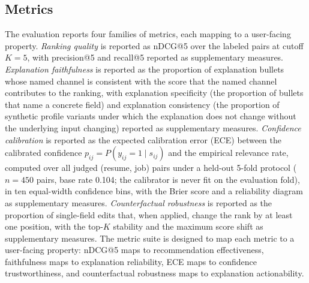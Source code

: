 \subsection{Metrics}\label{sec:4.3}
The evaluation reports four families of metrics, each mapping to a user-facing property.
\emph{Ranking quality} is reported as nDCG@5 \citep{jarvelin2002ndcg} over the labeled pairs at cutoff $K = 5$, with precision@5 and recall@5 reported as supplementary measures.
\emph{Explanation faithfulness} is reported as the proportion of explanation bullets whose named channel is consistent with the score that the named channel contributes to the ranking, with explanation specificity (the proportion of bullets that name a concrete field) and explanation consistency (the proportion of synthetic profile variants under which the explanation does not change without the underlying input changing) reported as supplementary measures.
\emph{Confidence calibration} is reported as the expected calibration error (ECE) \citep{guo2017calibration} between the calibrated confidence $p_{ij} = P(y_{ij}{=}1 \mid s_{ij})$ and the empirical relevance rate, computed over all judged (resume, job) pairs under a held-out 5-fold protocol ($n = 450$ pairs, base rate 0.104; the calibrator is never fit on the evaluation fold), in ten equal-width confidence bins, with the Brier score \citep{brier1950verification} and a reliability diagram as supplementary measures.
\emph{Counterfactual robustness} is reported as the proportion of single-field edits that, when applied, change the rank by at least one position, with the top-$K$ stability and the maximum score shift as supplementary measures.
The metric suite is designed to map each metric to a user-facing property: nDCG@5 maps to recommendation effectiveness, faithfulness maps to explanation reliability, ECE maps to confidence trustworthiness, and counterfactual robustness maps to explanation actionability.

